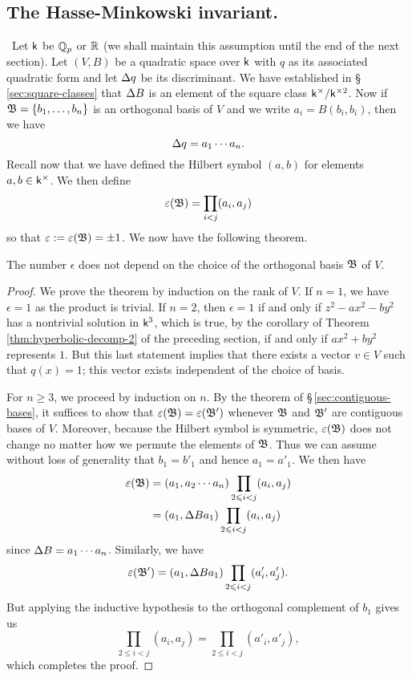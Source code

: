 \subsection{The Hasse-Minkowski invariant.}~Let \(\mathsf{k}\) be \(\mathbb{Q}_p\) or \(\mathbb{R}\) (we shall maintain this assumption until the end of the next section). Let \((V, B)\) be a quadratic space over \(\mathsf{k}\) with \(q\) as its associated quadratic form and let \({\Delta} q\) be its discriminant. We have established in \S\,\ref{sec:square-classes} that \({\Delta} B\) is an element of the square class \(\mathsf{k}^{\times}/\mathsf{k}^{\times2}\). Now if \(\mathfrak{B} = \{b_1, \dots, b_n\}\) is an orthogonal basis of \(V\) and we write \(a_{i} = B(b_i, b_i)\), then we have\label{sec:hasse-invariant}
\[
    {\Delta} q = a_1 \cdots a_n.  
\]
Recall now that we have defined the Hilbert symbol \((a, b)\) for elements \(a, b \in \mathsf{k}^{\times}\). We then define
\[
    \varepsilon(\mathfrak{B}) = \prod_{i < j} (a_i, a_j)
\]
so that \(\varepsilon := \varepsilon(\mathfrak{B}) = \pm 1\). We now have the following theorem.

\begin{theorem}{\normalfont\cite[pp.~35--36]{serre2012course}}
    The number \(\epsilon\) does not depend on the choice of the orthogonal basis \(\mathfrak{B}\) of \(V\).
\end{theorem}

\begin{proof}
    We prove the theorem by induction on the rank of \(V\). If \(n = 1\), we have \(\epsilon = 1\) as the product is trivial. If \(n = 2\), then \(\epsilon = 1\) if and only if \(z^2 - ax^2 - by^2\) has a nontrivial solution in \(\mathsf{k}^3\), which is true, by the corollary of Theorem \ref{thm:hyperbolic-decomp-2} of the preceding section, if and only if \(ax^2 + by^2\) represents \(1\). But this last statement implies that there exists a vector \(v \in V\) such that \(q(x) = 1\); this vector exists independent of the choice of basis.

    For \(n \geq 3\), we proceed by induction on \(n\). By the theorem of \S\,\ref{sec:contiguous-bases}, it suffices to show that \(\varepsilon(\mathfrak{B}) = \varepsilon(\mathfrak{B}')\) whenever \(\mathfrak{B}\) and \(\mathfrak{B}'\) are contiguous bases of \(V\). Moreover, because the Hilbert symbol is symmetric, \(\varepsilon(\mathfrak{B})\) does not change no matter how we permute the elements of \(\mathfrak{B}\). Thus we can assume without loss of generality that \(b_1 = b'_1\) and hence \(a_1 = a'_1\). We then have
    \begin{align*}
        \varepsilon(\mathfrak{B})  &= (a_1, a_2 \cdots a_n) \prod_{2 \leqslant i <j} (a_i, a_j) \\
                                &= (a_1, {\Delta} B a_1) \prod_{2 \leqslant i <j} (a_i, a_j)
    \end{align*}
    since \({\Delta} B = a_1 \cdots a_n\). Similarly, we have
    \[
        \varepsilon(\mathfrak{B'}) = (a_1, {\Delta} B a_1) \prod_{2 \leqslant i <j} (a'_i, a'_j).
    \]
    But applying the inductive hypothesis to the orthogonal complement of \(b_1\) gives us
    \[
        \prod_{2 \leq i <j} (a_i, a_j) = \prod_{2 \leq i <j} (a'_i, a'_j),  
    \]
    which completes the proof.
\end{proof}

